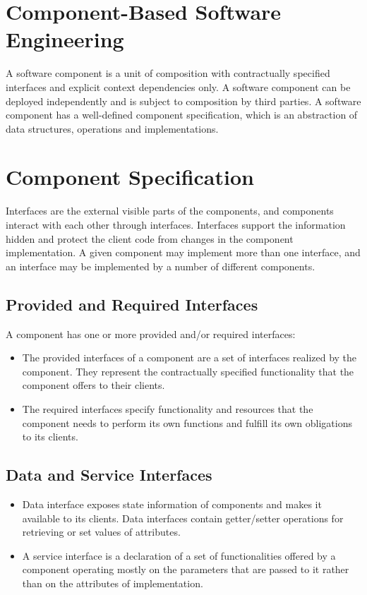 \documentclass[letterpaper, 10 pt, conference]{ieeeconf}
\begin{document}
\section{Component-Based Software Engineering}

A software component is a unit of composition with contractually specified interfaces and explicit context dependencies only. A software component can be deployed independently and is subject to composition by third parties.
A software component has a well-defined component specification, which is an abstraction of data structures, operations and implementations.

\section{Component Specification}

Interfaces are the external visible parts of the components, and components interact with each other through interfaces. Interfaces support the information hidden and protect the client code from changes in the component implementation. A given component may implement more than one interface, and an interface may be implemented by a number of different components. 


\subsection{Provided and Required Interfaces} 
A component has one or more provided and/or required interfaces:
\begin{itemize}
\item The provided interfaces of a component are a set of interfaces realized by the component. They represent the contractually specified functionality that the component offers to their clients. 
\item The required interfaces specify functionality and resources that the component needs to perform its own functions and fulfill its own obligations to its clients. 
\end{itemize}

\subsection{Data and Service Interfaces}
\begin{itemize}
\item Data interface exposes state information of components and makes it available to its clients. Data interfaces contain getter/setter operations for retrieving or set values of attributes.
\item A service interface is a declaration of a set of functionalities offered by a component operating mostly on the parameters that are passed to it rather than on the attributes of implementation.
\end{itemize}
\end{document}
